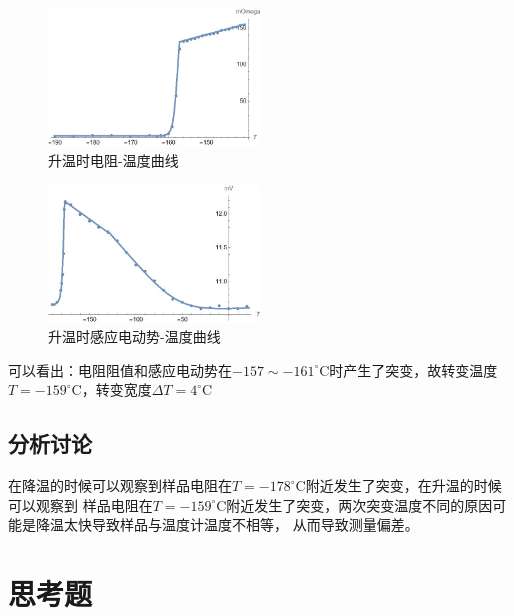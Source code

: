 \documentclass[UTF8]{ctexart}
\begin{document}
    \begin{figure}[H] %
        \centering %
        \includegraphics[width=0.5\textwidth]{img/2-1.jpg} %
        \caption{升温时电阻-温度曲线} %
        \label{升温RT} %
    \end{figure}
    \begin{figure}[H] %
        \centering %
        \includegraphics[width=0.5\textwidth]{img/2-2.jpg} %
        \caption{升温时感应电动势-温度曲线} %
        \label{升温UT} %
    \end{figure}

    可以看出：电阻阻值和感应电动势在$-157\sim-161^{\circ}$C时产生了突变，故转变温度$T=-159^{\circ}$C，转变宽度$\Delta T=4^{\circ}$C

    \subsection{分析讨论}

    在降温的时候可以观察到样品电阻在$T=-178^{\circ}$C附近发生了突变，在升温的时候可以观察到
    样品电阻在$T=-159^{\circ}$C附近发生了突变，两次突变温度不同的原因可能是降温太快导致样品与温度计温度不相等，
    从而导致测量偏差。

\section{思考题}
\end{document}
